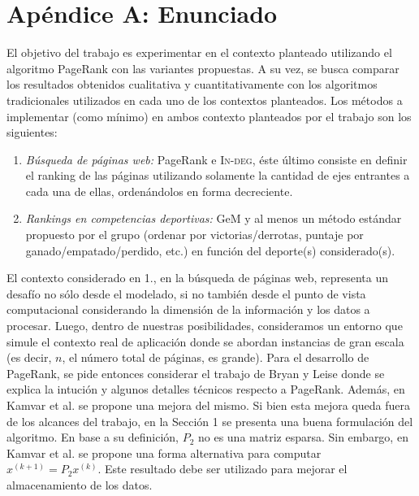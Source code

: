\section{Apéndice A: Enunciado}

El objetivo del trabajo es experimentar en el contexto planteado utilizando el algoritmo PageRank con las variantes propuestas. A su vez, se busca
comparar los resultados obtenidos cualitativa y cuantitativamente con los algoritmos tradicionales utilizados en cada uno de los contextos planteados. 
Los m\'etodos a implementar (como m\'inimo) en ambos contexto planteados por el trabajo son los siguientes:

\begin{enumerate}
\item \emph{B\'usqueda de p\'aginas web:} PageRank e \textsc{In-deg}, \'este \'ultimo consiste en definir el ranking de las p\'aginas utilizando 
solamente la cantidad de ejes entrantes a cada una de ellas, orden\'andolos en forma decreciente.
\item \emph{Rankings en competencias deportivas:} GeM y al menos un m\'etodo est\'andar propuesto por el grupo (ordenar por victorias/derrotas,
puntaje por ganado/empatado/perdido, etc.) en funci\'on del deporte(s) considerado(s).
\end{enumerate}

El contexto considerado en 1., en la b\'usqueda de p\'aginas web, representa un desaf\'io no s\'olo desde el modelado, si no tambi\'en desde el punto 
de vista computacional considerando la dimensi\'on de la informaci\'on y los datos a procesar. Luego, dentro de nuestras posibilidades, consideramos
un entorno que simule el contexto real de aplicaci\'on donde se abordan  instancias de gran escala (es decir, $n$, el n\'umero total de p\'aginas, es 
grande). Para el desarrollo de PageRank, se pide entonces considerar el trabajo de Bryan y Leise \cite{Bryan2006} donde se explica la intuci\'on y algunos 
detalles t\'ecnicos respecto a PageRank. Adem\'as, en Kamvar et al. \cite{Kamvar2003} se propone una mejora del mismo. Si bien esta mejora queda fuera de 
los alcances del trabajo, en la Secci\'on 1 se presenta una buena formulaci\'on del algoritmo. En base a su definici\'on, $P_2$ no es una matriz esparsa. 
Sin embargo, en Kamvar et al. \cite[Algoritmo 1]{Kamvar2003} se propone una forma alternativa para computar $x^{(k+1)} = P_2 x^{(k)}$. Este resultado debe 
ser utilizado para mejorar el almacenamiento de los datos.

